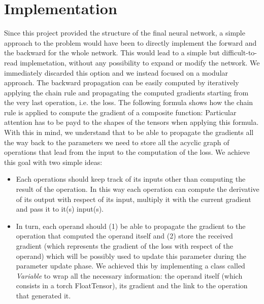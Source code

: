 \documentclass[10pt,conference,compsocconf]{IEEEtran}
\begin{document}
\section{Implementation}
Since this project provided the structure of the final neural network, a simple approach to the problem would have been to directly implement the forward and the backward for the whole network. This would lead to a simple but difficult-to-read implemetation, without any possibility to expand or modify the network. We immediately discarded this option and we instead focused on a modular approach.
The backward propagation can be easily computed by iteratively applying the chain rule and propagating the computed gradients starting from the very last operation, i.e. the loss. The following formula shows how the chain rule is applied to compute the gradient of a composite function:
Particular attention has to be payd to the shapes of the tensors when applying this formula. With this in mind, we understand that to be able to propagate the gradients all the way back to the parameters we need to store all the acyclic graph of operations that lead from the input to the computation of the loss. We achieve this goal with two simple ideas:
\begin{itemize}
    \item Each operations should keep track of its inputs other than computing the result of the operation. In this way each operation can compute the derivative of its output with respect of its input, multiply it with the current gradient and pass it to it(s) input(s).
    \item In turn, each operand should (1) be able to propagate the gradient to the operation that computed the operand itself and (2) store the received gradient (which represents the gradient of the loss with respect of the operand) which will be possibly used to update this parameter during the parameter update phase. We achieved this by implementing a class called \textit{Variable} to wrap all the necessary information: the operand itself (which consists in a torch FloatTensor), its gradient and the link to the operation that generated it.
\end{itemize}
\end{document}
